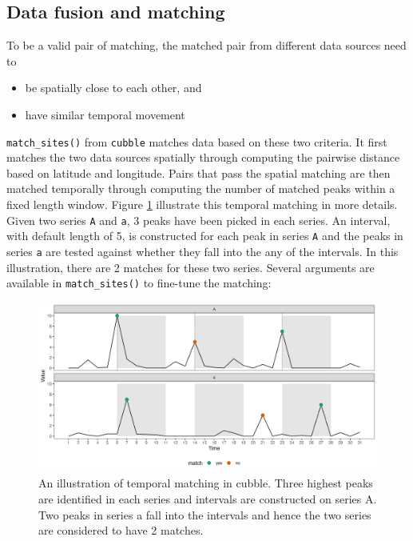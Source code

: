 \documentclass[
]{jss}
\providecommand{\tightlist}{%
  \setlength{\itemsep}{0pt}\setlength{\parskip}{0pt}}
\begin{document}
\hypertarget{data-fusion-and-matching}{%
\subsection{Data fusion and matching}\label{data-fusion-and-matching}}

To be a valid pair of matching, the matched pair from different data
sources need to

\begin{itemize}
\tightlist
\item
  be spatially close to each other, and
\item
  have similar temporal movement
\end{itemize}

\texttt{match\_sites()} from \texttt{cubble} matches data based on these
two criteria. It first matches the two data sources spatially through
computing the pairwise distance based on latitude and longitude. Pairs
that pass the spatial matching are then matched temporally through
computing the number of matched peaks within a fixed length window.
Figure \ref{fig:illu-matching} illustrate this temporal matching in more
details. Given two series \texttt{A} and \texttt{a}, 3 peaks have been
picked in each series. An interval, with default length of 5, is
constructed for each peak in series \texttt{A} and the peaks in series
\texttt{a} are tested against whether they fall into the any of the
intervals. In this illustration, there are 2 matches for these two
series. Several arguments are available in \texttt{match\_sites()} to
fine-tune the matching:

\begin{CodeChunk}
\begin{figure}

{\centering \includegraphics[width=1\linewidth]{figures/illu-matching} 

}

\caption[An illustration of temporal matching in cubble]{An illustration of temporal matching in cubble. Three highest peaks are identified in each series and intervals are constructed on series A. Two peaks in series a fall into the intervals and hence the two series are considered to have 2 matches.}\label{fig:illu-matching}
\end{figure}
\end{CodeChunk}
\end{document}
